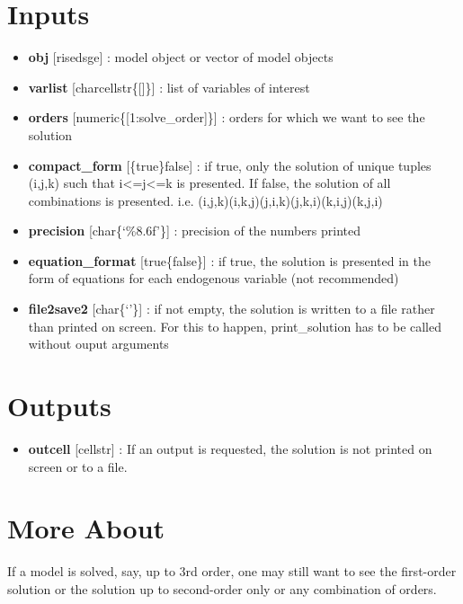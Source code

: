 \documentclass[letterpaper,10pt,english]{sphinxmanual}
\begin{document}
\section{Inputs}
\label{classes/models/@dsge/dsge:id129}\begin{itemize}
\item {} 
\textbf{obj} {[}rise\textbar{}dsge{]} : model object or vector of model objects

\item {} 
\textbf{varlist} {[}char\textbar{}cellstr\textbar{}\{{[}{]}\}{]} : list of variables of interest

\item {} 
\textbf{orders} {[}numeric\textbar{}\{{[}1:solve\_order{]}\}{]} : orders for which we want to
see the solution

\item {} 
\textbf{compact\_form} {[}\{true\}\textbar{}false{]} : if true, only the solution of unique
tuples (i,j,k) such that i\textless{}=j\textless{}=k is presented. If false, the solution
of all combinations is presented. i.e.
(i,j,k)(i,k,j)(j,i,k)(j,k,i)(k,i,j)(k,j,i)

\item {} 
\textbf{precision} {[}char\textbar{}\{`\%8.6f'\}{]} : precision of the numbers printed

\item {} 
\textbf{equation\_format} {[}true\textbar{}\{false\}{]} : if true, the solution is presented
in the form of equations for each endogenous variable (not recommended)

\item {} 
\textbf{file2save2} {[}char\textbar{}\{`'\}{]} : if not empty, the solution is written to a
file rather than printed on screen. For this to happen, print\_solution
has to be called without ouput arguments

\end{itemize}


\section{Outputs}
\label{classes/models/@dsge/dsge:id130}\begin{itemize}
\item {} 
\textbf{outcell} {[}cellstr{]} : If an output is requested, the solution is not
printed on screen or to a file.

\end{itemize}


\section{More About}
\label{classes/models/@dsge/dsge:id131}
If a model is solved, say, up to 3rd order, one may still want to see the
first-order solution or the solution up to second-order only or any
combination of orders.
\end{document}
